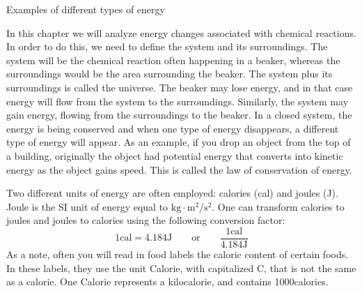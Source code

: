 \documentclass[main.tex]{subfiles}
\newcommand\chapterlabel{energy}
\begin{document}
\begin{description}
\begin{marginfigure}[2cm]
\caption{Examples of different types of energy}
\label{fig:{\chapterlabel}1}
\end{marginfigure}




\item[\docfilehook{The law of conservation energy}{}]
In this chapter we will analyze energy changes associated with chemical reactions. In order to do this, we need to define the system and its surroundings. The system will be the chemical reaction often happening in a beaker, whereas the surroundings would be the area surrounding the beaker. The system plus its surroundings is called the universe. The beaker may lose energy, and in that case energy will flow from the system to the surroundings. Similarly, the system may gain energy, flowing from the surroundings to the beaker.
In a closed system, the energy is being conserved and when one type of energy disappears, a different type of energy will appear. As an example, if you drop an object from the top of a building, originally the object had potential energy that converts into kinetic energy as the object gains speed. This is called the law of conservation of energy.


   
\item[\docfilehook{Energy units}{Energy units}] Two different units of energy are often employed: calories (cal) and joules (J). Joule is the SI unit of energy equal to $\text{kg}\cdot \text{m}^2/\text{s}^2$. One can transform calories to joules and joules to calories using the following conversion factor: 
\begin{equation}
\boxed{    1 \text{cal}=4.184 \text{J}   } \qquad\text{or}\qquad  \boxed{\frac{1\text{cal}}{4.184 \text{J}}}        
\label{formula2:1}
\end{equation}
As a note, often you will read in food labels the caloric content of certain foods. In these labels, they use the unit Calorie, with capitalized C, that is not the same as a calorie. One Calorie represents a kilocalorie, and contains 1000calories.



\end{description}
\end{document}
